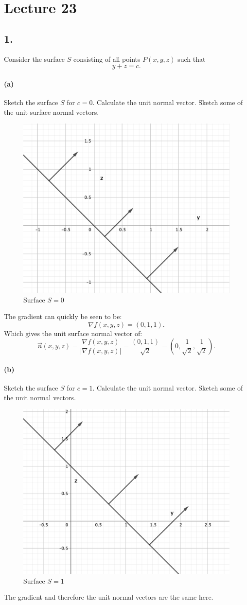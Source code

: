 \section*{Lecture 23}

\subsection*{1.} Consider the surface $S$ consisting of all points $P(x,y,z)$ such that
\[ 
y + z = c
.\]

\paragraph{(a)} Sketch the surface $S$ for $c=0$. Calculate the unit normal vector. Sketch some of the unit surface normal vectors.
\begin{figure} [ht]
  \centering
  \includegraphics[width=0.5\linewidth]{./figures/e23f1.png}
  \caption{Surface $S = 0$}
  \label{fig:e23f1}
\end{figure}
The gradient can quickly be seen to be:
\[ 
\nabla f (x,y,z) = \left( 0,1,1 \right) 
.\]
Which gives the unit surface normal vector of:
\[ 
\Vec{n}\left( x,y,z \right) = \frac{\nabla f \left( x,y,z \right) }{\left| \nabla f \left( x,y,z \right)  \right|} = \frac{\left( 0,1,1 \right) }{\sqrt{2}} = \left( 0, \frac{1}{\sqrt{2}}, \frac{1}{\sqrt{2}} \right) 
.\]


\paragraph{(b)} Sketch the surface $S$ for $c = 1$. Calculate the unit normal vector. Sketch some of the unit normal vectors.
\begin{figure} [ht]
  \centering
  \includegraphics[width=0.5\linewidth]{./figures/e23f2.png}
  \caption{Surface $S = 1$}
  \label{fig:e23f2}
\end{figure}
The gradient and therefore the unit normal vectors are the same here. 

